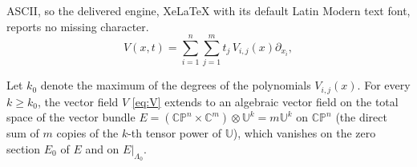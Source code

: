 \documentclass[10pt,a4paper]{amsart}
\newcommand\CP{\mathbb{CP}}
\newcommand\C{\mathbb{C}}
\newcommand\U{\mathbb{U}}
\newcommand\di{\partial}
\begin{document}
ASCII, so the delivered engine, XeLaTeX with its default Latin Modern text font, reports no missing character.
\begin{equation}\label{eq:V}
	V(x,t) = \sum_{i=1}^n \sum_{j=1}^m t_j \, V_{i,j}(x) \di_{x_i},
\end{equation}

\begin{lemma}\label{lem:V}
Let $k_0$ denote the maximum of the degrees of the polynomials $V_{i,j}(x)$.
For every $k\ge k_0$, the vector field $V$
\eqref{eq:V} extends to an algebraic vector field on the total space
of the vector bundle $E=(\CP^n \times \C^m)\otimes \U^k= m\U^k$ on 
$\CP^n$ (the direct sum of $m$ copies of the $k$-th tensor power of 
$\U$), which vanishes on the zero section
$E_0$ of $E$ and on $E|_{\Lambda_0}$. 
\end{lemma}
\end{document}
